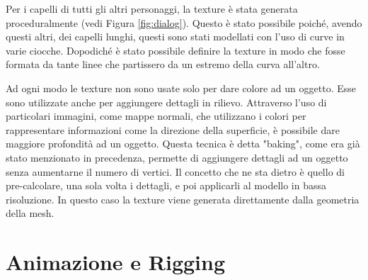Per i capelli di tutti gli altri personaggi, la texture è stata generata proceduralmente (vedi Figura \ref{fig:dialog}). Questo è stato possibile poiché, avendo questi altri, dei capelli lunghi, questi sono stati modellati con l'uso di curve in varie ciocche.
Dopodiché è stato possibile definire la texture in modo che fosse formata da tante linee che partissero da un estremo della curva all'altro.

Ad ogni modo le texture non sono usate solo per dare colore ad un oggetto. Esse sono utilizzate anche per aggiungere dettagli in rilievo.
Attraverso l'uso di particolari immagini, come mappe normali, che utilizzano i colori per rappresentare informazioni come la direzione della superficie, è possibile dare maggiore profondità ad un oggetto.
Questa tecnica è detta "baking", come era già stato menzionato in precedenza, permette di aggiungere dettagli ad un oggetto senza aumentarne il numero di vertici.
Il concetto che ne sta dietro è quello di pre-calcolare, una sola volta i dettagli, e poi applicarli al modello in bassa risoluzione.
In questo caso la texture viene generata direttamente dalla geometria della mesh.

\newpage
\section{Animazione e Rigging}

